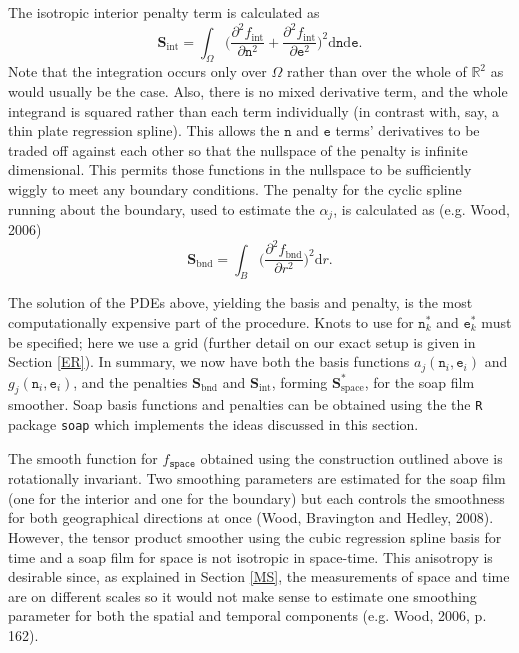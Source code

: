 The isotropic interior penalty term is calculated as
$$
\textbf{S}_\text{int} = \int_\Omega \Big(\frac{\partial^2 f_\text{int}}{\partial \texttt{n}^2}+\frac{\partial^2 f_\text{int}}{\partial \texttt{e}^2} 
\Big)^2\text{d}\texttt{n}\text{d}\texttt{e}.
$$
Note that the integration occurs only over $\Omega$ rather than over the whole of $\mathbb{R}^2$ as would usually be the case. Also, there is no mixed derivative term, and the whole integrand is squared rather than each term individually (in contrast with, say, a thin plate regression spline). This allows the $\texttt{n}$ and $\texttt{e}$ terms' derivatives to be traded off against each other so that the nullspace of the penalty is infinite dimensional. This permits those functions in the nullspace to be sufficiently wiggly to meet any boundary conditions. The penalty for the cyclic spline running about the boundary, used to estimate the $\alpha_j$, is calculated as (e.g. Wood, 2006)
$$
\textbf{S}_\text{bnd} = \int_B \Big(\frac{\partial^2 f_\text{bnd}}{\partial r^2}\Big)^2 \text{d}r.
$$

The solution of the PDEs above, yielding the basis and penalty, is the most computationally expensive part of the procedure. Knots to use for $\texttt{n}_k^*$ and $\texttt{e}_k^*$ must be specified; here we use a grid (further detail on our exact setup is given in Section \ref{ER}). In summary, we now have both the basis functions $a_j(\texttt{n}_i,\texttt{e}_i)$ and $g_j(\texttt{n}_i,\texttt{e}_i)$, and the penalties $\textbf{S}_\text{bnd}$ and $\textbf{S}_\text{int}$, forming $\textbf{S}^*_\text{space}$, for the soap film smoother. Soap basis functions and penalties can be obtained using the the \texttt{R} package \texttt{soap} which implements the ideas discussed in this section.

The smooth function for $f_\texttt{space}$ obtained using the construction outlined above is rotationally invariant. Two smoothing parameters are estimated for the soap film (one for the interior and one for the boundary) but each controls the smoothness for both geographical directions at once (Wood, Bravington and Hedley, 2008). However, the tensor product smoother using the cubic regression spline basis for time and a soap film for space is not isotropic in space-time. This anisotropy is desirable since, as explained in Section \ref{MS}, the measurements of space and time are on different scales so it would not make sense to estimate one smoothing parameter for both the spatial and temporal components (e.g. Wood, 2006, p. 162).


